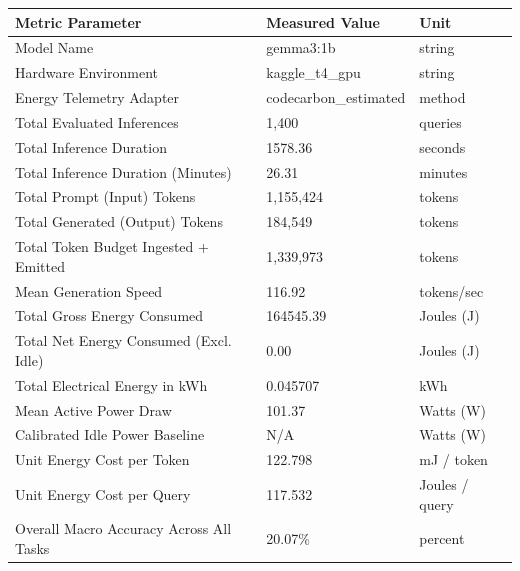 \begin{tabular}{lll}
\toprule
Metric Parameter & Measured Value & Unit \\
\midrule
Model Name & gemma3:1b & string \\
Hardware Environment & kaggle\_t4\_gpu & string \\
Energy Telemetry Adapter & codecarbon\_estimated & method \\
Total Evaluated Inferences & 1,400 & queries \\
Total Inference Duration & 1578.36 & seconds \\
Total Inference Duration (Minutes) & 26.31 & minutes \\
Total Prompt (Input) Tokens & 1,155,424 & tokens \\
Total Generated (Output) Tokens & 184,549 & tokens \\
Total Token Budget Ingested + Emitted & 1,339,973 & tokens \\
Mean Generation Speed & 116.92 & tokens/sec \\
Total Gross Energy Consumed & 164545.39 & Joules (J) \\
Total Net Energy Consumed (Excl. Idle) & 0.00 & Joules (J) \\
Total Electrical Energy in kWh & 0.045707 & kWh \\
Mean Active Power Draw & 101.37 & Watts (W) \\
Calibrated Idle Power Baseline & N/A & Watts (W) \\
Unit Energy Cost per Token & 122.798 & mJ / token \\
Unit Energy Cost per Query & 117.532 & Joules / query \\
Overall Macro Accuracy Across All Tasks & 20.07\% & percent \\
\bottomrule
\end{tabular}


